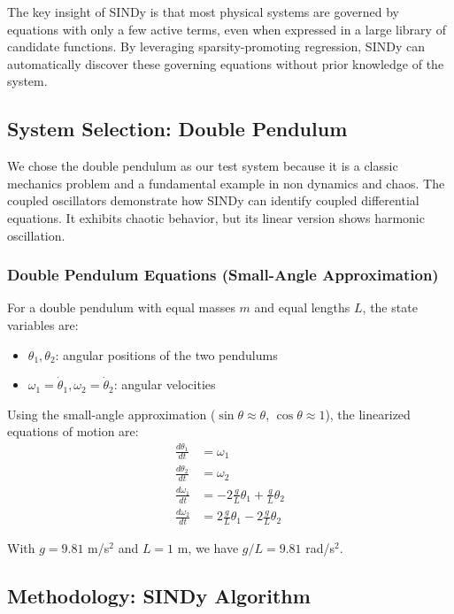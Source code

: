 \documentclass[12pt,a4paper]{article}
\begin{document}
The key insight of SINDy is that most physical systems are governed by equations with only a few active terms, even when expressed in a large library of candidate functions. By leveraging sparsity-promoting regression, SINDy can automatically discover these governing equations without prior knowledge of the system.

\subsection{System Selection: Double Pendulum}

We chose the double pendulum as our test system because it is a classic mechanics problem and a fundamental example in non dynamics and chaos. The coupled oscillators demonstrate how SINDy can identify coupled differential equations. It exhibits chaotic behavior, but its linear version shows harmonic oscillation.

\subsubsection{Double Pendulum Equations (Small-Angle Approximation)}

For a double pendulum with equal masses $m$ and equal lengths $L$, the state variables are:
\begin{itemize}
    \item $\theta_1, \theta_2$: angular positions of the two pendulums
    \item $\omega_1 = \dot{\theta}_1, \omega_2 = \dot{\theta}_2$: angular velocities
\end{itemize}

Using the small-angle approximation ($\sin\theta \approx \theta$, $\cos\theta \approx 1$), the linearized equations of motion are:
\begin{align}
    \frac{d\theta_1}{dt} &= \omega_1 \\
    \frac{d\theta_2}{dt} &= \omega_2 \\
    \frac{d\omega_1}{dt} &= -2\frac{g}{L}\theta_1 + \frac{g}{L}\theta_2 \\
    \frac{d\omega_2}{dt} &= 2\frac{g}{L}\theta_1 - 2\frac{g}{L}\theta_2
\end{align}

With $g = 9.81$ m/s$^2$ and $L = 1$ m, we have $g/L = 9.81$ rad/s$^2$.

\subsection{Methodology: SINDy Algorithm}
\end{document}
